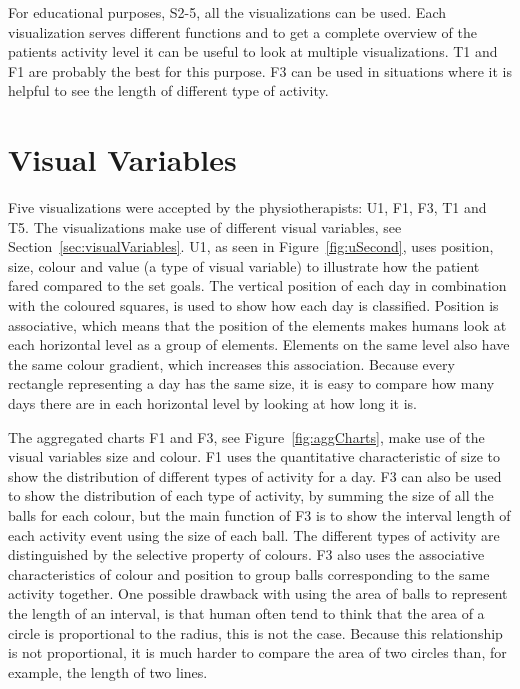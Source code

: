 For educational purposes, S2-5, all the visualizations can be used. Each visualization serves different functions and to get a complete overview of the patients activity level it can be useful to look at multiple visualizations. T1 and F1 are probably the best for this purpose. F3 can be used in situations where it is helpful to see the length of different type of activity.

\section{Visual Variables}
Five visualizations were accepted by the physiotherapists: U1, F1, F3, T1 and T5. The visualizations make use of different visual variables, see Section~\ref{sec:visualVariables}. U1, as seen in Figure~\ref{fig:uSecond}, uses position, size, colour and value (a type of visual variable) to illustrate how the patient fared compared to the set goals. The vertical position of each day in combination with the coloured squares, is used to show how each day is classified. Position is associative, which means that the position of the elements makes humans look at each horizontal level as a group of elements. Elements on the same level also have the same colour gradient, which increases this association. Because every rectangle representing a day has the same size, it is easy to compare how many days there are in each horizontal level by looking at how long it is.

The aggregated charts F1 and F3, see Figure~\ref{fig:aggCharts}, make use of the visual variables size and colour. F1 uses the quantitative characteristic of size to show the distribution of different types of activity for a day. F3 can also be used to show the distribution of each type of activity, by summing the size of all the balls for each colour, but the main function of F3 is to show the interval length of each activity event using the size of each ball. The different types of activity are distinguished by the selective property of colours. F3 also uses the associative characteristics of colour and position to group balls corresponding to the same activity together. One possible drawback with using the area of balls to represent the length of an interval, is that human often tend to think that the area of a circle is proportional to the radius, this is not the case. Because this relationship is not proportional, it is much harder to compare the area of two circles than, for example, the length of two lines.

